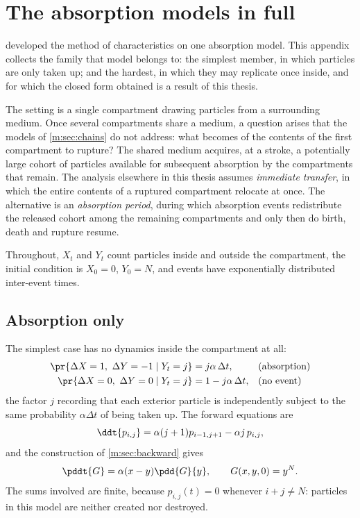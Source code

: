 \section{The absorption models in full}
\label{m:app:absorption}

 developed the method of characteristics on one absorption model.
This appendix collects the family that model belongs to: the simplest member, in
which particles are only taken up; and the hardest, in which they may replicate
once inside, and for which the closed form obtained is a result of this thesis.

The setting is a single compartment drawing particles from a surrounding medium.
Once several compartments share a medium, a question arises that the models of
\cref{m:sec:chains} do not address: what becomes of the contents of the first
compartment to rupture? The shared medium acquires, at a stroke, a potentially
large cohort of particles available for subsequent absorption by the compartments
that remain. The analysis elsewhere in this thesis assumes \emph{immediate
transfer}, in which the entire contents of a ruptured compartment relocate at once.
The alternative is an \emph{absorption period}, during which absorption events
redistribute the released cohort among the remaining compartments and only then do
birth, death and rupture resume.

Throughout, $X_t$ and $Y_t$ count particles inside and outside the compartment, the
initial condition is $X_0=0$, $Y_0=N$, and events have exponentially distributed
inter-event times.

\subsection{Absorption only}
\label{m:app:absonly}

The simplest case has no dynamics inside the compartment at all:
\begin{align*}
\pr{\Delta X=1,\ \Delta Y=-1\mid Y_t=j} &= j\alpha\,\Delta t, &&\text{(absorption)}\\
\pr{\Delta X=0,\ \Delta Y=0\mid Y_t=j} &= 1-j\alpha\,\Delta t, &&\text{(no event)}
\end{align*}
the factor $j$ recording that each exterior particle is independently subject to
the same probability $\alpha\Delta t$ of being taken up. The forward equations are
\begin{equation}
\label{m:eq:FK1}
\ddt{p_{i,j}} = \alpha(j+1)p_{i-1,j+1} - \alpha j\,p_{i,j},
\end{equation}
and the construction of \cref{m:sec:backward} gives
\begin{equation}
\label{m:eq:PDE1}
\pddt{G} = \alpha(x-y)\pdd{G}{y},
\qquad
G(x,y,0) = y^N .
\end{equation}
The sums involved are finite, because $p_{i,j}(t)=0$ whenever $i+j\neq N$: particles
in this model are neither created nor destroyed.

